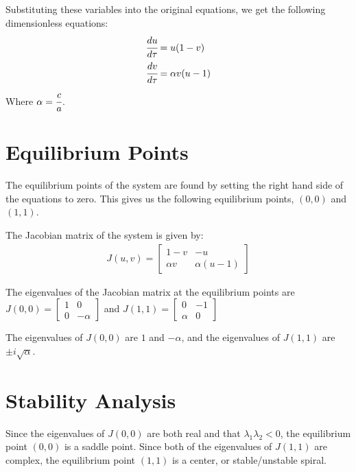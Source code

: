 \documentclass[11pt, letterpaper]{article}
\begin{document}
Substituting these variables into the original equations, we get the
following dimensionless equations:
\begin{align}
    \cfrac{du}{d\tau} & = u(1 - v)      \\
    \cfrac{dv}{d\tau} & = \alpha v(u-1)
\end{align}
Where $\alpha = \cfrac[diagonal]{c}{a}$.

\section{Equilibrium Points}
The equilibrium points of the system are found by setting the right hand
side of the equations to zero. This gives us the following equilibrium
points, $(0, 0)$ and $(1, 1)$.

The Jacobian matrix of the system is given by:
\begin{align*}
    J(u, v) = \begin{bmatrix}
                  1-v      & -u          \\
                  \alpha v & \alpha(u-1)
              \end{bmatrix}
\end{align*}

The eigenvalues of the Jacobian matrix at the equilibrium points are
$J(0, 0) = \begin{bmatrix}
        1 & 0       \\
        0 & -\alpha
    \end{bmatrix}$ and $J(1, 1) = \begin{bmatrix}
        0      & -1 \\
        \alpha & 0
    \end{bmatrix}$

The eigenvalues of $J(0, 0)$ are $1$ and $-\alpha$, and the eigenvalues of
$J(1, 1)$ are $\pm i\sqrt{\alpha}$.

\section{Stability Analysis}

Since the eigenvalues of $J(0, 0)$ are both real and that $\lambda_1
    \lambda_2 < 0$, the equilibrium point $(0, 0)$ is a saddle point.
Since both of the eigenvalues of $J(1, 1)$ are complex, the equilibrium
point $(1, 1)$ is a center, or stable/unstable spiral.
\end{document}
